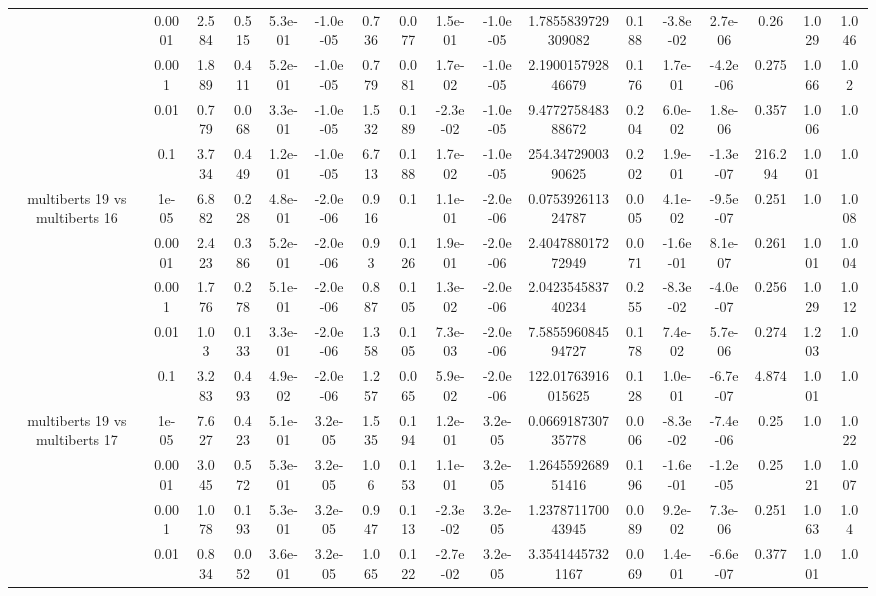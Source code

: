 \begin{tabular}{|c|c|c|c|c|c|c|c|c|c|c|c|c|c|c|c|c|}
 & 0.0001 & 2.584 & 0.515 & 5.3e-01 & -1.0e-05 & 0.736 & 0.077 & 1.5e-01 & -1.0e-05 & 1.7855839729309082 & 0.188 & -3.8e-02 & 2.7e-06 & 0.26 & 1.029 & 1.046 \\
 & 0.001 & 1.889 & 0.411 & 5.2e-01 & -1.0e-05 & 0.779 & 0.081 & 1.7e-02 & -1.0e-05 & 2.190015792846679 & 0.176 & 1.7e-01 & -4.2e-06 & 0.275 & 1.066 & 1.02 \\
 & 0.01 & 0.779 & 0.068 & 3.3e-01 & -1.0e-05 & 1.532 & 0.189 & -2.3e-02 & -1.0e-05 & 9.477275848388672 & 0.204 & 6.0e-02 & 1.8e-06 & 0.357 & 1.006 & 1.0 \\
 & 0.1 & 3.734 & 0.449 & 1.2e-01 & -1.0e-05 & 6.713 & 0.188 & 1.7e-02 & -1.0e-05 & 254.3472900390625 & 0.202 & 1.9e-01 & -1.3e-07 & 216.294 & 1.001 & 1.0 \\
\hline
\multirow{5}{*}{multiberts 19 vs multiberts 16} & 1e-05 & 6.882 & 0.228 & 4.8e-01 & -2.0e-06 & 0.916 & 0.1 & 1.1e-01 & -2.0e-06 & 0.075392611324787 & 0.005 & 4.1e-02 & -9.5e-07 & 0.251 & 1.0 & 1.008 \\
 & 0.0001 & 2.423 & 0.386 & 5.2e-01 & -2.0e-06 & 0.93 & 0.126 & 1.9e-01 & -2.0e-06 & 2.404788017272949 & 0.071 & -1.6e-01 & 8.1e-07 & 0.261 & 1.001 & 1.004 \\
 & 0.001 & 1.776 & 0.278 & 5.1e-01 & -2.0e-06 & 0.887 & 0.105 & 1.3e-02 & -2.0e-06 & 2.042354583740234 & 0.255 & -8.3e-02 & -4.0e-07 & 0.256 & 1.029 & 1.012 \\
 & 0.01 & 1.03 & 0.133 & 3.3e-01 & -2.0e-06 & 1.358 & 0.105 & 7.3e-03 & -2.0e-06 & 7.585596084594727 & 0.178 & 7.4e-02 & 5.7e-06 & 0.274 & 1.203 & 1.0 \\
 & 0.1 & 3.283 & 0.493 & 4.9e-02 & -2.0e-06 & 1.257 & 0.065 & 5.9e-02 & -2.0e-06 & 122.01763916015625 & 0.128 & 1.0e-01 & -6.7e-07 & 4.874 & 1.001 & 1.0 \\
\hline
\multirow{5}{*}{multiberts 19 vs multiberts 17} & 1e-05 & 7.627 & 0.423 & 5.1e-01 & 3.2e-05 & 1.535 & 0.194 & 1.2e-01 & 3.2e-05 & 0.066918730735778 & 0.006 & -8.3e-02 & -7.4e-06 & 0.25 & 1.0 & 1.022 \\
 & 0.0001 & 3.045 & 0.572 & 5.3e-01 & 3.2e-05 & 1.06 & 0.153 & 1.1e-01 & 3.2e-05 & 1.264559268951416 & 0.196 & -1.6e-01 & -1.2e-05 & 0.25 & 1.021 & 1.007 \\
 & 0.001 & 1.078 & 0.193 & 5.3e-01 & 3.2e-05 & 0.947 & 0.113 & -2.3e-02 & 3.2e-05 & 1.237871170043945 & 0.089 & 9.2e-02 & 7.3e-06 & 0.251 & 1.063 & 1.04 \\
 & 0.01 & 0.834 & 0.052 & 3.6e-01 & 3.2e-05 & 1.065 & 0.122 & -2.7e-02 & 3.2e-05 & 3.35414457321167 & 0.069 & 1.4e-01 & -6.6e-07 & 0.377 & 1.001 & 1.0 \\

\end{tabular}
